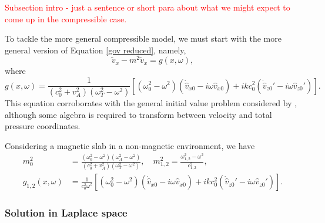 \documentclass[12pt]{../style-files/ociamthesis}
\begin{document}
\textcolor{red}{Subsection intro - just a sentence or short para about what we might expect to come up in the compressible case.}

To tackle the more general compressible model, we must start with the more general version of Equation \eqref{gov reduced}, namely,
\begin{equation}
\tilde{v}_x - m^2 \tilde{v}_x = g(x, \omega),
\end{equation}
where
\begin{equation}
g(x, \omega) = \frac{1}{(c_0^2 + v_A^2)(\omega_T^2 - \omega^2)}\left[ (\omega_0^2 - \omega^2)\left(\dot{\hat{v}}_{x0} - i\omega \hat{v}_{x0}\right) + ikc_0^2\left( \dot{\hat{v}}_{z0}' - i\omega \hat{v}_{z0}'\right) \right].
\end{equation}
This equation corroborates with the general initial value problem considered by \cite{and_etal07}, although some algebra is required to transform between velocity and total pressure coordinates.

Considering a magnetic slab in a non-magnetic environment, we have
\begin{align}
m_0^2 &= \frac{(\omega_0^2 - \omega^2)(\omega_A^2 - \omega^2)}{(c_0^2 + v_A^2)(\omega_T^2 - \omega^2)}, \quad m_{1,2}^2 = \frac{\omega_{1,2}^2 - \omega^2}{c_{1,2}^2}, \\
g_{1,2}(x, \omega) &= \frac{1}{c_0^2\omega^2} \left[ (\omega_0^2 - \omega^2)\left(\dot{\hat{v}}_{x0} - i\omega \hat{v}_{x0}\right) + ikc_0^2\left( \dot{\hat{v}}_{z0}' - i\omega \hat{v}_{z0}'\right) \right].
\end{align}


\subsubsection{Solution in Laplace space}
\end{document}
